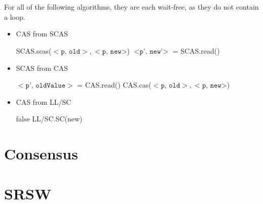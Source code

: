 \documentclass[11pt]{article}
\begin{document}
\maketitle

\section{}
For all of the following algorithms, they are each wait-free, as they do not contain a loop.
\begin{itemize}
    \item
    \begin{algorithm}
        \caption{CAS from SCAS}
        \begin{algorithmic}[1]
            \State SCAS.scas($<\texttt{p, old}>, <\texttt{p, new>}$)
            \State $<\texttt{p', new'>}$ = SCAS.read()
            \State {}
        \EndFunction
        \end{algorithmic}
    \end{algorithm}
    \item
    \begin{algorithm}
        \caption{SCAS from CAS}
        \begin{algorithmic}[1]
            \State $< \texttt{p', oldValue} >$ = CAS.read()
            \State CAS.cas($<\texttt{p, old}>, <\texttt{p, new>}$)
            \State {}
        \EndFunction
        \end{algorithmic}
    \end{algorithm}
    \item 
    \begin{algorithm}
        \caption{CAS from LL/SC}
        \begin{algorithmic}[1]
                    \State \Return false
                \EndIf
                \State \Return LL/SC.SC(new)
            \EndFunction
        \end{algorithmic}
    \end{algorithm}
\end{itemize}

\section{Consensus}

\section{SRSW}
\end{document}
